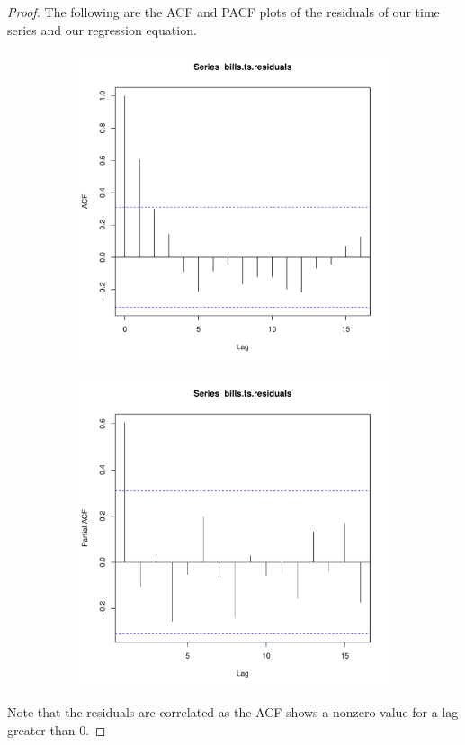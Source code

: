 \documentclass[12pt]{article}
\theoremstyle{definition}
\begin{document}
\begin{proof}
The following are the ACF and PACF plots of the residuals of our time series and our
regression equation.

\begin{figure}[h]
  \begin{subfigure}{.4\textwidth}
    \centering
    \includegraphics[scale=0.45]{residuals_acf}
  \end{subfigure}
  \begin{subfigure}{.7\textwidth}
    \centering
    \includegraphics[scale=0.45]{residuals_pacf}
  \end{subfigure}
\end{figure}

Note that the residuals are correlated as the ACF shows a nonzero value for a
lag greater than 0.
\end{proof}
\end{document}
